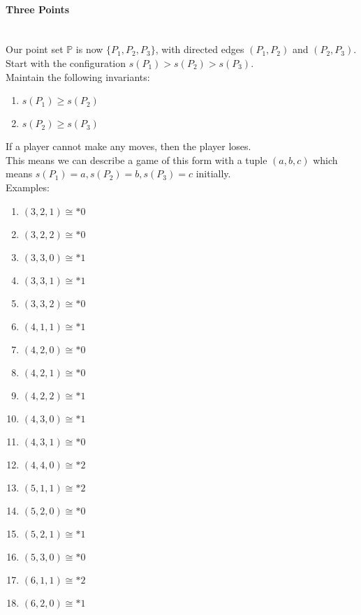 \documentclass{article}
\begin{document}
\paragraph{Three Points}\mbox{}\\
Our point set $\mathbb{P}$ is now $\{P_1, P_2, P_3\}$, with directed edges
$(P_1, P_2)$ and $(P_2, P_3)$. \\
Start with the configuration $s(P_1) > s(P_2) > s(P_3)$. \\
Maintain the following invariants:
\begin{enumerate}
  \item $s(P_1) \geq s(P_2)$
  \item $s(P_2) \geq s(P_3)$
\end{enumerate}
If a player cannot make any moves, then the player loses. \\
This means we can describe a game of this form with a tuple
$(a,b,c)$ which means $s(P_1) = a, s(P_2) = b, s(P_3) = c$ initially. \\
Examples:
\begin{enumerate}
  \item $(3, 2, 1) \cong *0$ 
  \item $(3, 2, 2) \cong *0$
  \item $(3, 3, 0) \cong *1$ 
  \item $(3, 3, 1) \cong *1$
  \item $(3, 3, 2) \cong *0$
  \item $(4, 1, 1) \cong *1$ 
  \item $(4, 2, 0) \cong *0$ 
  \item $(4, 2, 1) \cong *0$
  \item $(4, 2, 2) \cong *1$
  \item $(4, 3, 0) \cong *1$
  \item $(4, 3, 1) \cong *0$
  \item $(4, 4, 0) \cong *2$
  \item $(5, 1, 1) \cong *2$
  \item $(5, 2, 0) \cong *0$
  \item $(5, 2, 1) \cong *1$
  \item $(5, 3, 0) \cong *0$
  \item $(6, 1, 1) \cong *2$
  \item $(6, 2, 0) \cong *1$
\end{enumerate}
\end{document}
